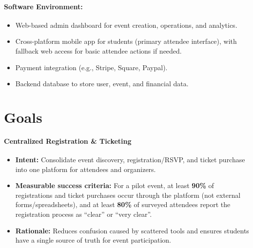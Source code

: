 \documentclass{article}
\begin{document}
\paragraph{Software Environment:}
\begin{itemize}
    \item Web-based admin dashboard for event creation, operations, and analytics.
    \item Cross-platform mobile app for students (primary attendee interface), with fallback web access for basic attendee actions if needed.
    \item Payment integration (e.g., Stripe, Square, Paypal).
    \item Backend database to store user, event, and financial data.
\end{itemize}


\section{Goals}


\paragraph{Centralized Registration \& Ticketing}
\begin{itemize}
    \item \textbf{Intent:} Consolidate event discovery, registration/RSVP, and ticket purchase into one platform for attendees and organizers.
    \item \textbf{Measurable success criteria:} For a pilot event, at least \textbf{90\%} of registrations and ticket purchases occur through the platform (not external forms/spreadsheets), and at least \textbf{80\%} of surveyed attendees report the registration process as ``clear'' or ``very clear''.
    \item \textbf{Rationale:} Reduces confusion caused by scattered tools and ensures students have a single source of truth for event participation.
\end{itemize}
\end{document}
